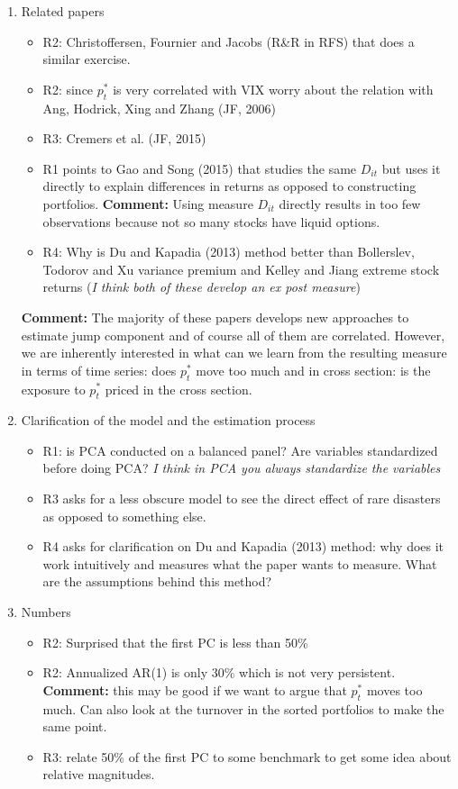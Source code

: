 \documentclass[11pt]{article}
\begin{document}
\begin{enumerate}
	\item Related papers
	\begin{itemize}
		\item R2: Christoffersen, Fournier and Jacobs (R\&R in RFS) that does a similar exercise.
		\item R2: since $p^*_t$ is very correlated with VIX worry about the relation with Ang, Hodrick, Xing and Zhang (JF, 2006)
		\item R3: Cremers et al. (JF, 2015)
		\item R1 points to Gao and Song (2015) that studies the same $D_{it}$ but uses it directly to explain differences in returns as opposed to constructing portfolios. \textbf{Comment:} Using measure $D_{it}$ directly results in too few observations because not so many stocks have liquid options.
		\item R4: Why is Du and Kapadia (2013) method better than Bollerslev, Todorov and Xu variance premium and Kelley and Jiang extreme stock returns (\textit{I think both of these develop an ex post measure})
	\end{itemize}

	\textbf{Comment:} The majority of these papers develops new approaches to estimate jump component and of course all of them are correlated. However, we are inherently interested in what can we learn from the resulting measure in terms of time series: does $p_t^*$ move too much and in cross section: is the exposure to $p_t^*$ priced in the cross section.

	\item Clarification of the model and the estimation process
	\begin{itemize}
		\item R1: is PCA conducted on a balanced panel? Are variables standardized before doing PCA? \textit{I think in PCA you always standardize the variables}
		\item R3 asks for a less obscure model to see the direct effect of rare disasters as opposed to something else.
		\item R4 asks for clarification on Du and Kapadia (2013) method: why does it work intuitively and measures what the paper wants to measure. What are the assumptions behind this method?
	\end{itemize}

	\item Numbers
	\begin{itemize}
		\item R2: Surprised that the first PC is less than 50\%
		\item R2: Annualized AR(1) is only 30\% which is not very persistent. \textbf{Comment:} this may be good if we want to argue that $p_t^*$ moves too much. Can also look at the turnover in the sorted portfolios to make the same point.
		\item R3: relate 50\% of the first PC to some benchmark to get some idea about relative magnitudes.
	\end{itemize}




\end{enumerate}
\end{document}
